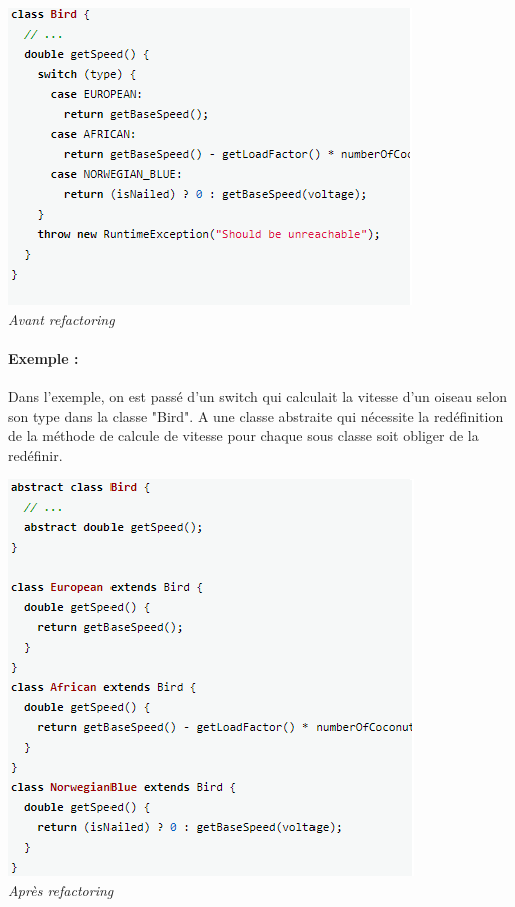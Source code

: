 \documentclass[a4paper,twoside,12pt,openright]{report}
\begin{document}
\begin{center}
\includegraphics[scale=1]{Image/ReplaceConditionalPoly.png}\\
\itshape{Avant refactoring \cite{ref5}}
\end{center}

\paragraph{Exemple :}
Dans l'exemple, on est passé d'un switch qui calculait la vitesse d'un oiseau selon son type dans la classe "Bird". A une classe abstraite qui nécessite la redéfinition de la méthode de calcule de vitesse pour chaque sous classe soit obliger de la redéfinir.

\begin{center}
\includegraphics[scale=1]{Image/ReplaceConditionalPoly2.png}\\
\itshape{Après refactoring \cite{ref5}}
\end{center}
\end{document}
